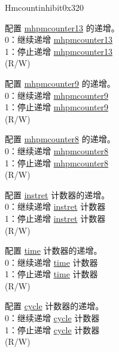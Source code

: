 \begin{register}{H}{mcountinhibit}{0x320}\label{regdesc:MCOUNTINHIBIT}
%
%
%
%
%
%
%
%
%
\regnewline%
\begin{regdesc}\begin{reglist}
\label{fielddesc:MCOUNTERINH_HPM_13}\item [{HPM13}] 配置 \hyperref[regdesc:MHPMCOUNTER13] {mhpmcounter13} 的递增。 \\
0：继续递增 \hyperref[regdesc:MHPMCOUNTER13] {mhpmcounter13}\\
1：停止递增 \hyperref[regdesc:MHPMCOUNTER13] {mhpmcounter13} \\
(R/W)
\label{fielddesc:MCOUNTERINH_HPM_9}\item [{HPM9}] 配置 \hyperref[regdesc:MHPMCOUNTER9] {mhpmcounter9} 的递增。\\
0：继续递增 \hyperref[regdesc:MHPMCOUNTER9] {mhpmcounter9}\\
1：停止递增 \hyperref[regdesc:MHPMCOUNTER9] {mhpmcounter9} \\
(R/W)
\label{fielddesc:MCOUNTERINH_HPM_8}\item [{HPM8}] 配置 \hyperref[regdesc:MHPMCOUNTER8] {mhpmcounter8} 的递增。\\
0：继续递增 \hyperref[regdesc:MHPMCOUNTER8] {mhpmcounter8}\\
1：停止递增 \hyperref[regdesc:MHPMCOUNTER8] {mhpmcounter8} \\
(R/W)
\label{fielddesc:MCOUNTINHIBIT_IR}\item [IR] 配置 \hyperref[regdesc:INSTRET]{instret} 计数器的递增。 \\
0：继续递增 \hyperref[regdesc:INSTRET]{instret} 计数器\\
1：停止递增 \hyperref[regdesc:INSTRET]{instret} 计数器 \\
(R/W) \\
\label{fielddesc:MCOUNTINHIBIT_TM}\item [TM] 配置 \hyperref[regdesc:TIME]{time} 计数器的递增。 \\
0：继续递增 \hyperref[regdesc:TIME]{time} 计数器\\
1：停止递增 \hyperref[regdesc:TIME]{time} 计数器 \\
(R/W) \\
\label{fielddesc:MCOUNTINHIBIT_CY}\item [CY] 配置 \hyperref[regdesc:CYCLE]{cycle} 计数器的递增。 \\
0：继续递增 \hyperref[regdesc:CYCLE]{cycle} 计数器\\
1：停止递增 \hyperref[regdesc:CYCLE]{cycle} 计数器\\
(R/W)\\
\end{reglist}\end{regdesc}
\end{register}

